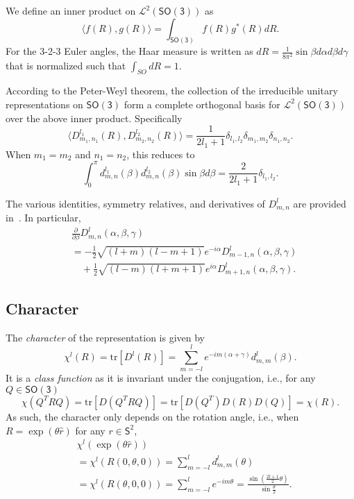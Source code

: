 \documentclass{ieeetran}
\newcommand{\pair}[1]{\ensuremath{\langle #1 \rangle}}
\newcommand{\trs}[1]{\mathrm{tr}\ensuremath{[#1]}}
\newcommand{\deriv}[2]{\ensuremath{\frac{\partial #1}{\partial #2}}}
\newcommand{\SO}{\ensuremath{\mathsf{SO(3)}}}
\newcommand{\Sph}{\ensuremath{\mathsf{S}}}
\begin{document}
We define an inner product on $\mathcal{L}^2(\SO)$ as
\[
\pair{f(R),g(R)}=\int_{\SO} f(R) g^*(R) dR.
\]
For the 3-2-3 Euler angles, the Haar measure is written as $dR = \frac{1}{8\pi^2}\sin\beta d\alpha d\beta d\gamma$ that is normalized such that $\int_{SO} dR = 1$. 

According to the Peter-Weyl theorem, the collection of the irreducible unitary representations on $\SO$ form a complete orthogonal basis for $\mathcal{L}^2(\SO)$ over the above inner product. Specifically
\begin{equation}
\pair{ D^{l_1}_{m_1,n_1}(R), D^{l_2}_{m_2,n_2}(R)} = \frac{1}{2l_1+1}\delta_{l_1,l_2}\delta_{m_1,m_2}\delta_{n_1,n_2}. \label{eqn:D_ortho}
\end{equation}
When $m_1=m_2$ and $n_1=n_2$, this reduces to
\[
\int_{0}^\pi d^{l_1}_{m,n}(\beta)d^{l_2}_{m,n}(\beta)\sin\beta d\beta = \frac{2}{2l_1+1}\delta_{l_1,l_2}. 
\]

The various identities, symmetry relatives, and derivatives of $D^{l}_{m,n}$ are provided in~\cite{VarMos88}. In particular,
\begin{align}
&\deriv{}{\beta} D^l_{m,n}(\alpha,\beta,\gamma)\nonumber\\
& = -\frac{1}{2}\sqrt{(l+m)(l-m+1)}e^{-i\alpha} D^l_{m-1,n}(\alpha,\beta,\gamma)\nonumber\\
& \quad + \frac{1}{2}\sqrt{(l-m)(l+m+1)}e^{i\alpha} D^l_{m+1,n}(\alpha,\beta,\gamma).\label{eqn:dD_dbeta}
\end{align}


\subsection{Character}

The \textit{character} of the representation is given by
\[
\chi^l(R) = \trs{D^l(R)}=\sum_{m=-l}^l e^{-im(\alpha+\gamma)} d^l_{m,m}(\beta).
\]
It is a \textit{class function} as it is invariant under the conjugation, i.e., for any $Q\in\SO$
\[
\chi(Q^T R Q) = \trs{D(Q^T R Q)}=\trs{D(Q^T)D(R)D(Q)}=\chi(R).
\]
As such, the character only depends on the rotation angle, i.e., when $R=\exp(\theta\hat r)$ for any $r\in\Sph^2$, 
\begin{align*}
&\chi^l(\exp(\theta\hat r))\\
&= \chi^l{(R(0,\theta,0))}= \sum_{m=-l}^l d^l_{m,m}(\theta)\\
&= \chi^l{(R(\theta,0,0))}= \sum_{m=-l}^l e^{-im\theta}
=\frac{\sin(\frac{2l+1}{2}\theta)}{\sin\frac{\theta}{2}}.
\end{align*}
\end{document}

